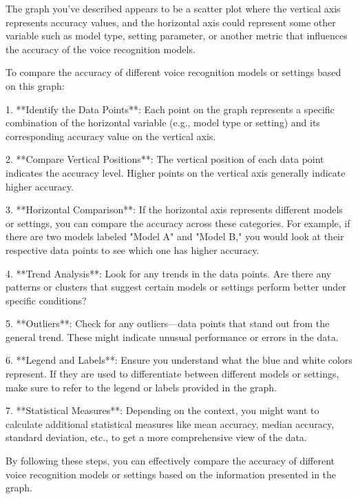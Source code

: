 The graph you've described appears to be a scatter plot where the vertical axis represents accuracy values, and the horizontal axis could represent some other variable such as model type, setting parameter, or another metric that influences the accuracy of the voice recognition models.

To compare the accuracy of different voice recognition models or settings based on this graph:

1. **Identify the Data Points**: Each point on the graph represents a specific combination of the horizontal variable (e.g., model type or setting) and its corresponding accuracy value on the vertical axis.

2. **Compare Vertical Positions**: The vertical position of each data point indicates the accuracy level. Higher points on the vertical axis generally indicate higher accuracy.

3. **Horizontal Comparison**: If the horizontal axis represents different models or settings, you can compare the accuracy across these categories. For example, if there are two models labeled "Model A" and "Model B," you would look at their respective data points to see which one has higher accuracy.

4. **Trend Analysis**: Look for any trends in the data points. Are there any patterns or clusters that suggest certain models or settings perform better under specific conditions?

5. **Outliers**: Check for any outliers—data points that stand out from the general trend. These might indicate unusual performance or errors in the data.

6. **Legend and Labels**: Ensure you understand what the blue and white colors represent. If they are used to differentiate between different models or settings, make sure to refer to the legend or labels provided in the graph.

7. **Statistical Measures**: Depending on the context, you might want to calculate additional statistical measures like mean accuracy, median accuracy, standard deviation, etc., to get a more comprehensive view of the data.

By following these steps, you can effectively compare the accuracy of different voice recognition models or settings based on the information presented in the graph.